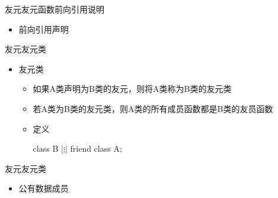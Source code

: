 \begin{frame}[t, fragile]{友元}{友元函数前向引用说明}%
  \begin{itemize}
  \item 前向引用声明
  \end{itemize}
  \begin{center}
    \begin{minipage}{0.28\linewidth}
    \end{minipage}\quad
    \begin{minipage}{0.66\linewidth}
    \end{minipage}
  \end{center}
\end{frame}
\begin{frame}[t, fragile]{友元}{友元类}%
  \begin{spacing}{1.5}
  \begin{itemize}
  \item 友元类
    \begin{itemize}
    \item 如果A类声明为B类的友元，则将A类称为B类的\alert{友元类}
    \item 若A类为B类的友元类，则A类的所有成员函数都是B类的友员函数
    \item 定义\\
      \begin{center}
        \begin{cpptt}
class B
{
  |$\vdots$|
  friend class A;
}
        \end{cpptt}
      \end{center}
    \end{itemize}
  \end{itemize}
  \end{spacing}
\end{frame}

\begin{frame}[t, fragile]{友元}{友元类}%
  \begin{itemize}
  \item 公有数据成员
  \end{itemize}
  \begin{center}
    \begin{minipage}{0.45\linewidth}
    \end{minipage}\quad
    \begin{minipage}{0.48\linewidth}
    \end{minipage}
  \end{center}
\end{frame}

